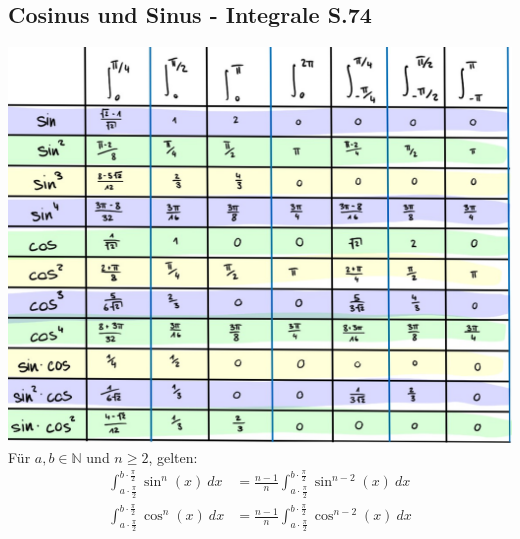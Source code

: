 \subsection{Cosinus und Sinus - Integrale \texorpdfstring{\hfill S.74}{S.74}}
    
    \includegraphics[width = \linewidth]{src/Appendix/integraltabelle_sin_cos.jpg}
    Für $a,b \in \mathbb{N}$ und $n \geq 2$, gelten:
    \begin{align*}
        \int_{a \cdot \frac{\pi}{2}}^{b \cdot \frac{\pi}{2}} \sin^n(x) \ dx 
            &= \frac{n-1}{n} \int_{a \cdot \frac{\pi}{2}}^{b \cdot \frac{\pi}{2}} \sin^{n-2}(x) \ dx\\[0.5em]
        \int_{a \cdot \frac{\pi}{2}}^{b \cdot \frac{\pi}{2}} \cos^n(x) \ dx 
            &= \frac{n-1}{n} \int_{a \cdot \frac{\pi}{2}}^{b \cdot \frac{\pi}{2}} \cos^{n-2}(x) \ dx
    \end{align*}